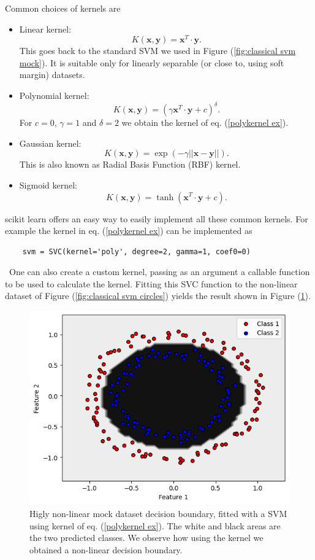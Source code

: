 \documentclass[a4paper]{article}
\begin{document}
Common choices of kernels are
\begin{itemize}
    \item Linear kernel: $$K(\mathbf{x},\mathbf{y})=\mathbf{x}^T\cdot\mathbf{y}.$$ This goes back to the standard SVM we used in Figure (\ref{fig:classical svm mock}). It is suitable only for linearly separable (or close to, using soft margin) datasets.
    \item Polynomial kernel: $$K(\mathbf{x},\mathbf{y})=(\gamma\mathbf{x}^T\cdot\mathbf{y}+c)^\delta.$$ For $c=0$, $\gamma=1$ and $\delta=2$ we obtain the kernel of eq. (\ref{polykernel ex}). 
    \item Gaussian kernel: $$K(\mathbf{x},\mathbf{y})=\exp(-\gamma||\mathbf{x}-\mathbf{y}||).$$ This is also known as Radial Basis Function (RBF) kernel. 
    \item Sigmoid kernel: $$K(\mathbf{x},\mathbf{y})=\tanh(\mathbf{x}^T\cdot\mathbf{y}+c).$$
\end{itemize}
scikit learn offers an easy way to easily implement all these common kernels. For example the kernel in eq. (\ref{polykernel ex}) can be implemented as 
\begin{lstlisting}
    svm = SVC(kernel='poly', degree=2, gamma=1, coef0=0)
\end{lstlisting}\
One can also create a custom kernel, passing as an argument a callable function to be used to calculate the kernel. Fitting this SVC function to the non-linear dataset of Figure (\ref{fig:classical svm circles}) yields the result shown in Figure (\ref{fig:classical svm circle decision boundary}). 
\begin{figure}[h!]
    \centering
    \includegraphics[width=\textwidth]{images/circlesclassicaldecisionboundary.png}
    \caption{Higly non-linear mock dataset decision boundary, fitted with a SVM using kernel of eq. (\ref{polykernel ex}). The white and black areas are the two predicted classes. We observe how using the kernel we obtained a non-linear decision boundary.}
    \label{fig:classical svm circle decision boundary}
\end{figure}
\end{document}
